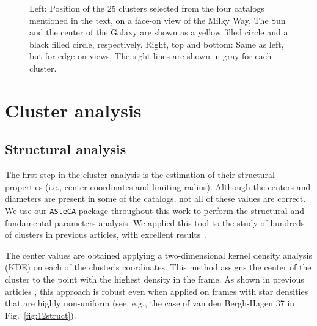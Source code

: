 \documentclass{aa}
\begin{document}
 \begin{figure}
  \caption{Left: Position of the 25 clusters selected from the four
    catalogs mentioned in the text, on a face-on view of the Milky Way. The Sun
    and the center of the Galaxy are shown as  a yellow filled circle and a
    black filled circle, respectively. Right, top and bottom: Same as left, but for edge-on views.
    The sight lines are shown in gray for each cluster.}
  \label{fig:MWmap}
 \end{figure}





\section{Cluster analysis}
 \label{sec:clust_analy}

 \subsection{Structural analysis}

  The first step in the cluster analysis is the estimation of their structural
  properties (i.e., center coordinates and limiting radius). Although the centers and
  diameters are present in some of the catalogs, not all of these values are
  correct. We use our \texttt{ASteCA} package throughout this
  work to perform the structural and fundamental parameters analysis. We 
  applied this tool to the study of hundreds of clusters in previous articles,
  with excellent results~\citep{Perren_2017,Perren_2020}.

  The center values are obtained applying a two-dimensional kernel density
  analysis (KDE) on each of the cluster's coordinates. This method assigns the
  center of the cluster to the point with the highest density in the frame. As
  shown in previous articles \citep{Perren_2015,Perren_2017,Perren_2020}, this
  approach is robust even when applied on frames with star densities that
  are highly non-uniform (see, e.g., the case of van den Bergh-Hagen 37
  in Fig.~\ref{fig:12struct}).
\end{document}
